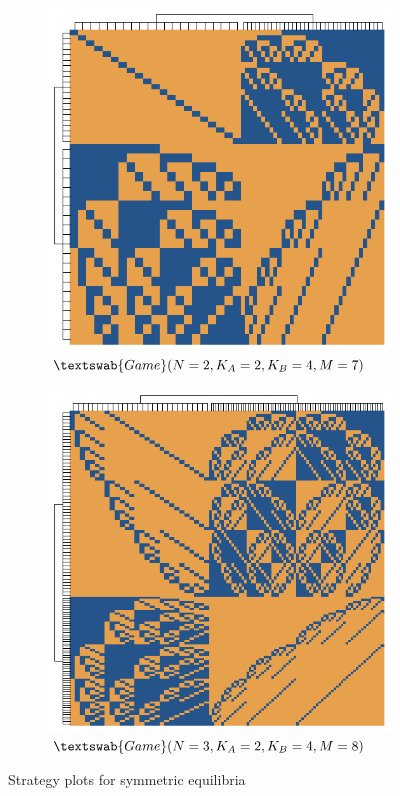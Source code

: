 \documentclass{article}
\theoremstyle{definition}
\newcommand{\G}[1]{$\textswab{Game}(#1)$}
\begin{document}
\begin{figure}[H]
    \centering
    \begin{subfigure}[b]{0.45\textwidth}
        \includegraphics[width=\textwidth]{img/StrategyPlot_2_2_4_7.pdf}
        \caption{\G{N=2,K_A=2,K_B=4,M=7}}
        \label{fig:StrategyPlot_G_2_2_4_7}
    \end{subfigure}
    \hspace{0.05\textwidth} %
    \begin{subfigure}[b]{0.45\textwidth}
        \includegraphics[width=\textwidth]{img/StrategyPlot_3_2_4_8.pdf}
        \caption{\G{N=3,K_A=2,K_B=4,M=8}}
        \label{fig:StrategyPlot_G_3_2_4_8}
    \end{subfigure}
    \caption{Strategy plots for symmetric equilibria}
    \label{fig:StrategyPlots}
\end{figure}
\end{document}
